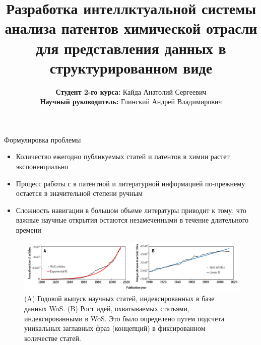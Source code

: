 \documentclass{beamer}
\title[] %
{Разработка интеллктуальной системы анализа патентов химической отрасли\\ для представления данных в структурированном виде}
\author[] %
{\textbf{Студент 2-го курса:} Кайда Анатолий Сергеевич \\  
\textbf{Научный руководитель:} Глинский Андрей Владимирович}
\institute[]
{
	
}
\date[\today] 
{}
\begin{document}
	
	\begin{frame}
		\titlepage
	\end{frame}
	
	
	\begin{frame}{Формулировка проблемы}
		\begin{itemize}
			\item Количество ежегодно публикуемых статей и патентов в химии растет экспоненциально
			\item Процесс работы с в патентной и литературной информацией по-прежнему остается в значительной степени ручным
			\item Сложность навигации в большом объеме литературы приводит к тому, что важные научные открытия остаются незамеченными в течение длительного времени
		\end{itemize}
	
	\begin{figure}
		\centering
		\includegraphics[width=1\textwidth]{images/growth_of_science.png}
		\caption[pt9]{(A) Годовой выпуск научных статей, индексированных в базе данных WoS. (B) Рост идей, охватываемых статьями, индексированными в WoS. Это было определено путем подсчета уникальных заглавных фраз (концепций) в фиксированном количестве статей.}
		\label{fig: growth_of_science}
	\end{figure}
			
				
						 
	
	\end{frame}
	
\end{document}
